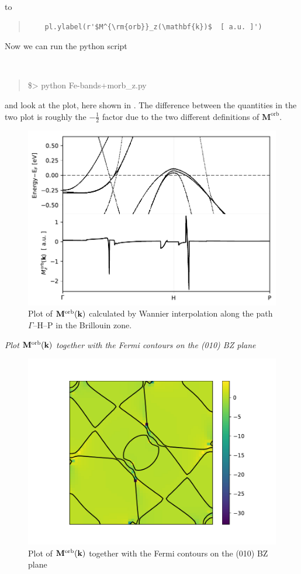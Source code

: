 \begin{itemize}
to

\begin{quote}
\begin{verbatim}
	pl.ylabel(r'$M^{\rm{orb}}_z(\mathbf{k})$  [ a.u. ]')
\end{verbatim}
\end{quote}

Now we can run the python script

{\tt
\begin{quote}
\$> python Fe-bands+morb\_z.py
\end{quote}
}

and look at the plot, here shown in .
The difference between the quantities in the two plot is roughly the $-\frac{1}{2}$ factor due to the two different definitions of $\mathbf{M}^{\mathrm{orb}}$.
\begin{figure}[t!]
\centering
\includegraphics[width=0.6\columnwidth]{figure/example19/Fe-morb_z.pdf}
\caption{Plot of $\mathbf{M}^{\mathrm{orb}}(\bfk)$ calculated by Wannier
interpolation along the path $\Gamma$--H--P in the Brillouin zone.}\label{fig19.1}
\end{figure}

{\it Plot $\mathbf{M}^{\mathrm{orb}}(\bfk)$ together with the Fermi contours on the (010) BZ plane}

\begin{figure}[b!]
\centering
\includegraphics[width=0.7\columnwidth]{figure/example19/Fe-kslice-morb_z+fermi_lines.pdf}
\caption{Plot of $\mathbf{M}^{\mathrm{orb}}(\bfk)$ together with the Fermi contours on the (010) BZ plane}\label{fig19.3}
\end{figure}

\end{itemize}
